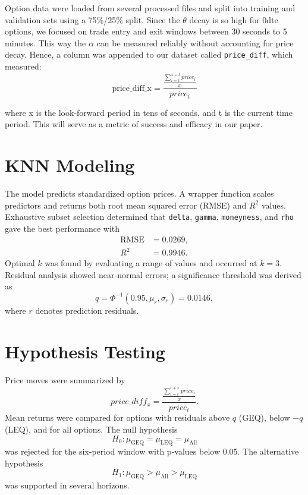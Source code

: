 \documentclass{article}
\begin{document}
Option data were loaded from several processed files and split into training and validation sets using a 75\%/25\% split. Since the $\theta$ decay is so high for 0dte options, we focused on trade entry and exit windows between 30 seconds to 5 minutes. This way the $\alpha$ can be measured reliably without accounting for price decay. Hence, a column was appended to our dataset called \texttt{price\_diff}, which measured:
\[
\text{price\_diff_x} = \frac{\frac{\sum_{i=t}^{x+t}{price_i}}{x}}{price_{t}}
\]

where x is the look-forward period in tens of seconds, and t is the current time period. This will serve as a metric of success and efficacy in our paper.

\section{KNN Modeling}
The model predicts standardized option prices. A wrapper function scales predictors and returns both root mean squared error (RMSE) and $R^2$ values. Exhaustive subset selection determined that \verb|delta|, \verb|gamma|, \verb|moneyness|, and \verb|rho| gave the best performance with
\begin{align*}
\text{RMSE} &= 0.0269,\\
R^2 &= 0.9946.
\end{align*}
Optimal $k$ was found by evaluating a range of values and occurred at $k=3$. Residual analysis showed near-normal errors; a significance threshold was derived as
\begin{equation*}
q = \Phi^{-1}(0.95,\mu_{r},\sigma_{r}) = 0.0146,
\end{equation*}
where $r$ denotes prediction residuals.
\section{Hypothesis Testing}
Price moves were summarized by
\begin{equation*}
price\_diff_{x} = \frac{\frac{\sum_{i=t}^{t+x}{price_i}}{x}}{price_{t}}.
\end{equation*}
Mean returns were compared for options with residuals above $q$ (GEQ), below $-q$ (LEQ), and for all options. The null hypothesis
\begin{equation*}
H_0 : \mu_{\text{GEQ}} = \mu_{\text{LEQ}} = \mu_{\text{All}}
\end{equation*}
was rejected for the six-period window with p-values below 0.05. The alternative hypothesis
\begin{equation*}
H_1 : \mu_{\text{GEQ}} > \mu_{\text{All}} > \mu_{\text{LEQ}}
\end{equation*}
was supported in several horizons.
\end{document}

